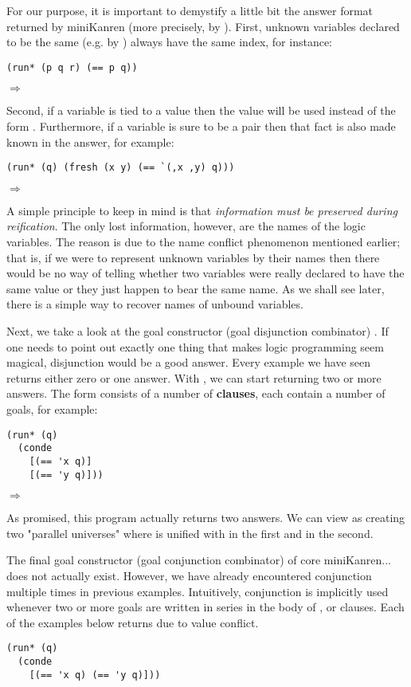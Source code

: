 For our purpose, it is important to demystify a little bit the answer format returned by miniKanren (more precisely, by ). First, unknown variables declared to be the same (e.g. by \code{==}) always have the same index, for instance:
\begin{lstlisting}
(run* (p q r) (== p q))
\end{lstlisting}
$\Rightarrow$ 

Second, if a variable is tied to a value then the value will be used instead of the form . Furthermore, if a variable is sure to be a pair then that fact is also made known in the answer, for example:
\begin{lstlisting}
(run* (q) (fresh (x y) (== `(,x ,y) q)))
\end{lstlisting}
$\Rightarrow$ 

A simple principle to keep in mind is that \textit{information must be preserved during reification}. The only lost information, however, are the names of the logic variables. The reason is due to the name conflict phenomenon mentioned earlier; that is, if we were to represent unknown variables by their names then there would be no way of telling whether two variables were really declared to have the same value or they just happen to bear the same name. As we shall see later, there is a simple way to recover names of unbound variables.

Next, we take a look at the goal constructor (goal disjunction combinator) .
If one needs to point out exactly one thing that makes logic programming seem magical, disjunction would be a good answer. Every example we have seen returns either zero or one answer. With , we can start returning two or more answers. The  form consists of a number of \textbf{clauses}, each contain a number of goals, for example:

\begin{lstlisting}
(run* (q)
  (conde
    [(== 'x q)]
    [(== 'y q)]))
\end{lstlisting}
$\Rightarrow$ 

As promised, this program actually returns two answers. We can view  as creating two "parallel universes" where  is unified with  in the first and  in the second.

The final goal constructor (goal conjunction combinator) of core miniKanren... does not actually exist. However, we have already encountered conjunction multiple times in previous examples. Intuitively, conjunction is implicitly used whenever two or more goals are written in series in the body of ,  or  clauses. Each of the examples below returns \code{()} due to value conflict.
\begin{lstlisting}
(run* (q)
  (conde
    [(== 'x q) (== 'y q)]))
\end{lstlisting}

